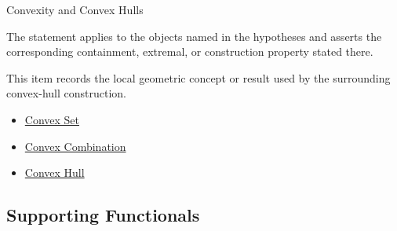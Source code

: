 \begin{topicbox}{Convexity and Convex Hulls}
\begin{remark*}
The statement applies to the objects named in the hypotheses and asserts the
corresponding containment, extremal, or construction property stated there.
\end{remark*}

\begin{remark*}[Interpretation]
This item records the local geometric concept or result used by the surrounding
convex-hull construction.
\end{remark*}

\begin{dependencies}
\begin{itemize}
  \item \hyperref[def:computational-geometry-convex-set]{Convex Set}
  \item \hyperref[def:computational-geometry-convex-combination]{Convex Combination}
  \item \hyperref[def:computational-geometry-convex-hull]{Convex Hull}
\end{itemize}
\end{dependencies}
\end{topicbox}

\subsection*{Supporting Functionals}

